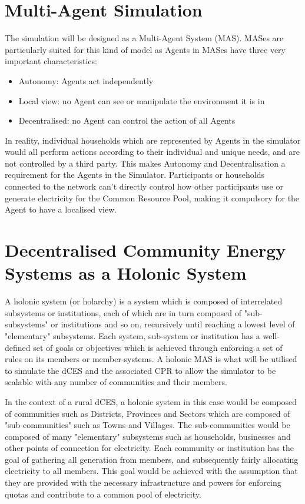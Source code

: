 \clearpage

\section*{Multi-Agent Simulation}
The simulation will be designed as a Multi-Agent System (MAS). MASes are particularly suited for this kind of model as Agents in MASes have three very important characteristics:
\begin{itemize}
	\item Autonomy: Agents act independently
	\item Local view: no Agent can see or manipulate the environment it is in
	\item Decentralised: no Agent can control the action of all Agents
\end{itemize}
In reality, individual households which are represented by Agents in the simulator would all perform actions according to their individual and unique needs, and are not controlled by a third party. This makes Autonomy and Decentralisation a requirement for the Agents in the Simulator. Participants or households connected to the network can't directly control how other participants use or generate electricity for the Common Resource Pool, making it compulsory for the Agent to have a localised view. 

\section*{Decentralised Community Energy Systems as a Holonic System}
A holonic system (or holarchy) is a system which is composed of interrelated subsystems or institutions, each of which are in turn composed of "sub-subsystems"  or institutions and so on, recursively until reaching a lowest level of "elementary" subsystems. Each system, sub-system or institution has a well-defined set of goals or objectives which is achieved through enforcing a set of rules on its members or member-systems\cite{Pitt:Holonic_Institutions}. A holonic MAS is what will be utilised to simulate the dCES and the associated CPR to allow the simulator to be scalable with any number of communities and their members. 

In the context of a rural dCES, a holonic system in this case would be composed of communities such as Districts, Provinces and Sectors which are composed of "sub-communities" such as Towns and Villages. The sub-communities would be composed of many "elementary" subsystems such as households, businesses and other points of connection for electricity. Each community or institution has the goal of gathering all generation from members, and subsequently fairly allocating electricity to all members. This goal would be achieved with the assumption that they are provided with the necessary infrastructure and powers for enforcing quotas and contribute to a common pool of electricity.

